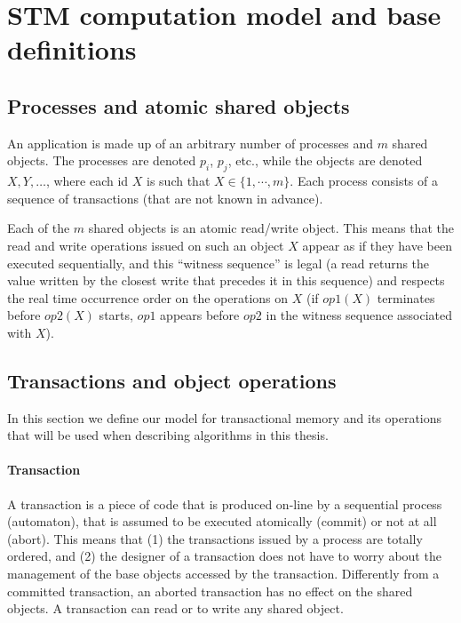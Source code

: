 \section{STM computation model and base definitions}
\label{sec:model-and-conditions}



\subsection{Processes  and atomic shared objects}
An application is made up of  an  arbitrary number  of  processes  and  $m$
shared  objects.  The processes are denoted $p_i$, $p_j$, etc., 
while the  objects are  denoted $X,Y,\ldots$, where each id $X$ is such 
that $X \in \{1,\cdots,m\}$.   Each process consists of  a sequence of 
transactions (that are not known in advance).

Each of the $m$ shared objects is an atomic read/write object. 
This means  that the read and  write operations issued on  such an  object
$X$  appear as  if they have  been executed  sequentially, and this 
``witness sequence'' is  legal (a read returns the value written by the  
closest write  that precedes it in this sequence) and respects the real time 
occurrence  order on the operations on $X$ (if  $op1(X)$  terminates  before
$op2(X)$  starts, $op1$ appears before $op2$ in the witness sequence 
associated with $X$). 




\subsection{Transactions and object operations}
\label{base-definitions}
In this section we define our model for transactional memory and its operations
that will be used when describing algorithms in this thesis.

\paragraph{Transaction}
A transaction is  a piece of code that is produced  on-line by a sequential
process (automaton), that is assumed to be executed  atomically (commit) or
not  at all  (abort). This  means  that (1)  the transactions  issued by  a
process are totally ordered, and (2) the designer of a transaction does 
not have to  worry about the  management of the  base objects  accessed  
by the transaction.  Differently from  a committed transaction, an aborted  
transaction has no effect on the shared objects. 
A transaction  can read or to write any shared object. 
 

